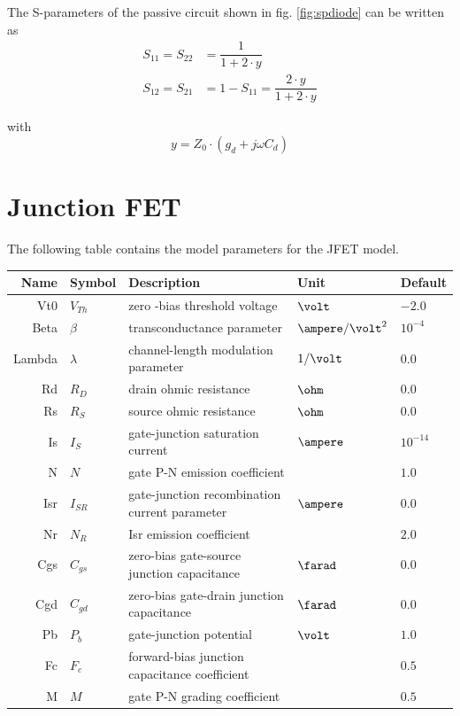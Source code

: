 \documentclass[10pt]{report}
\begin{document}
The S-parameters of the passive circuit shown in
fig. \ref{fig:spdiode} can be written as
\begin{align}
S_{11} = S_{22} &= \dfrac{1}{1 + 2\cdot y}\\
S_{12} = S_{21} &= 1 - S_{11} = \dfrac{2\cdot y}{1 + 2\cdot y}
\end{align}

with
\begin{equation}
y = Z_{0}\cdot \left(g_{d} + j\omega C_{d}\right)
\end{equation}

\section{Junction FET}

The following table contains the model parameters for the JFET model.

\addvspace{12pt}

\begin{tabular}{rllll}
Name & Symbol & Description & Unit & Default\\
\hline
Vt0 & $V_{Th}$ & zero -bias threshold voltage & $\volt$ & $-2.0$\\
Beta & $\beta$ & transconductance parameter & $\ampere / \volt^{2}$ & $10^{-4}$\\
Lambda & $\lambda$ & channel-length modulation parameter & $1/\volt$ & $0.0$\\
Rd & $R_{D}$ & drain ohmic resistance & $\ohm$ & $0.0$\\
Rs & $R_{S}$ & source ohmic resistance & $\ohm$ & $0.0$\\
Is & $I_{S}$ & gate-junction saturation current & $\ampere$ & $10^{-14}$\\
N & $N$ & gate P-N emission coefficient & & $1.0$\\
Isr & $I_{SR}$ & gate-junction recombination current parameter & $\ampere$ & $0.0$\\
Nr & $N_{R}$ & Isr emission coefficient & & $2.0$\\
Cgs & $C_{gs}$ & zero-bias gate-source junction capacitance & $\farad$ & $0.0$\\
Cgd & $C_{gd}$ & zero-bias gate-drain junction capacitance & $\farad$ & $0.0$\\
Pb & $P_{b}$ & gate-junction potential & $\volt$ & $1.0$\\
Fc & $F_{c}$ & forward-bias junction capacitance coefficient & & $0.5$\\
M & $M$ & gate P-N grading coefficient & & $0.5$
\end{tabular}
\end{document}
